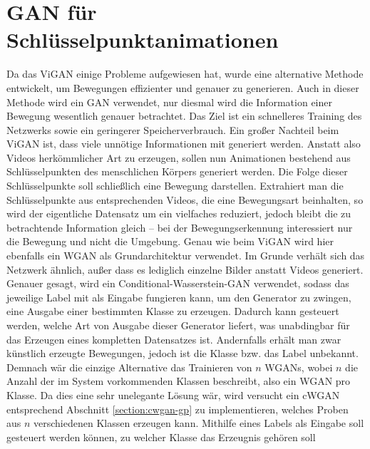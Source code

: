 \section{GAN für Schlüsselpunktanimationen}
Da das ViGAN einige Probleme aufgewiesen hat, wurde eine alternative Methode
entwickelt, um Bewegungen effizienter und genauer zu generieren. Auch in dieser
Methode wird ein GAN verwendet, nur diesmal wird die Information einer Bewegung
wesentlich genauer betrachtet. Das Ziel ist ein schnelleres Training des
Netzwerks sowie ein geringerer Speicherverbrauch. Ein großer Nachteil beim ViGAN
ist, dass viele unnötige Informationen mit generiert werden. Anstatt also Videos
herkömmlicher Art zu erzeugen, sollen nun Animationen bestehend aus
Schlüsselpunkten des menschlichen Körpers generiert werden. Die Folge dieser
Schlüsselpunkte soll schließlich eine Bewegung darstellen. Extrahiert man die
Schlüsselpunkte aus entsprechenden Videos, die eine Bewegungsart beinhalten, so
wird der eigentliche Datensatz um ein vielfaches reduziert, jedoch bleibt die
zu betrachtende Information gleich -- bei der Bewegungserkennung interessiert
nur die Bewegung und nicht die Umgebung. Genau wie beim ViGAN wird hier
ebenfalls ein WGAN als Grundarchitektur verwendet. Im Grunde verhält sich das
Netzwerk ähnlich, außer dass es lediglich einzelne Bilder anstatt Videos
generiert. Genauer gesagt, wird ein Conditional-Wasserstein-GAN verwendet,
sodass das jeweilige Label mit als Eingabe fungieren kann, um den Generator zu
zwingen, eine Ausgabe einer bestimmten Klasse zu erzeugen. Dadurch kann
gesteuert werden, welche Art von Ausgabe dieser Generator liefert, was
unabdingbar für das Erzeugen eines kompletten Datensatzes ist. Andernfalls
erhält man zwar künstlich erzeugte Bewegungen, jedoch ist die Klasse bzw. das
Label unbekannt. Demnach wär die einzige Alternative das Trainieren von $n$
WGANs, wobei $n$ die Anzahl der im System vorkommenden Klassen beschreibt, also
ein WGAN pro Klasse. Da dies eine sehr unelegante Lösung wär, wird versucht ein
cWGAN entsprechend Abschnitt \ref{section:cwgan-gp} zu implementieren, welches
Proben aus $n$ verschiedenen Klassen erzeugen kann. Mithilfe eines Labels als
Eingabe soll gesteuert werden können, zu welcher Klasse das Erzeugnis gehören
soll

